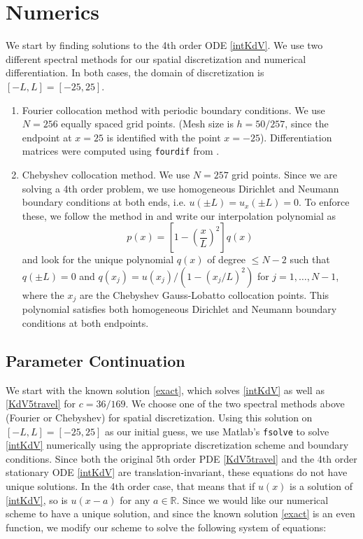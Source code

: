 \documentclass[12pt]{article}
\def\R{{\mathbb R}}
\begin{document}
\section{Numerics}

We start by finding solutions to the 4th order ODE \eqref{intKdV}. We use two different spectral methods for our spatial discretization and numerical differentiation. In both cases, the domain of discretization is $[-L, L] = [-25, 25]$.

\begin{enumerate}
	\item Fourier collocation method with periodic boundary conditions. We use $N = 256$ equally spaced grid points. (Mesh size is $h = 50 / 257$, since the endpoint at $x = 25$ is identified with the point $x = -25$). Differentiation matrices were computed using \texttt{fourdif} from \cite{Weideman2000}.
	\item Chebyshev collocation method. We use $N = 257$ grid points. Since we are solving a 4th order problem, we use homogeneous Dirichlet and Neumann boundary conditions at both ends, i.e. $u(\pm L) = u_x(\pm L) = 0$. To enforce these, we follow the method in \cite{Trefethen2000} and write our interpolation polynomial as
	\begin{equation}
		p(x) = \left[ 1 - \left(\frac{x}{L}\right)^2\right]q(x)
	\end{equation}
	and look for the unique polynomial $q(x)$ of degree $\leq N-2$ such that $q(\pm L) = 0$ and $q(x_j) = u(x_j) / (1 - (x_j / L)^2)$ for $j = 1, \dots, N-1$, where the $x_j$ are the Chebyshev Gauss-Lobatto collocation points. This polynomial satisfies both homogeneous Dirichlet and Neumann boundary conditions at both endpoints.
\end{enumerate}

\subsection{Parameter Continuation}

We start with the known solution \eqref{exact}, which solves \eqref{intKdV} as well as \eqref{KdV5travel} for $c = 36/169$. We choose one of the two spectral methods above (Fourier or Chebyshev) for spatial discretization. Using this solution on $[-L, L] = [-25, 25]$ as our initial guess, we use Matlab's \texttt{fsolve} to solve \eqref{intKdV} numerically using the appropriate discretization scheme and boundary conditions. Since both the original 5th order PDE \eqref{KdV5travel} and the 4th order stationary ODE \eqref{intKdV} are translation-invariant, these equations do not have unique solutions. In the 4th order case, that means that if $u(x)$ is a solution of \eqref{intKdV}, so is $u(x - a)$ for any $a \in \R$. Since we would like our numerical scheme to have a unique solution, and since the known solution \eqref{exact} is an even function, we modify our scheme to solve the following system of equations:
\end{document}
